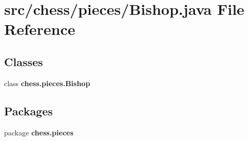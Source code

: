 \section{src/chess/pieces/\+Bishop.java File Reference}
\label{_bishop_8java}
\subsection*{Classes}
\begin{DoxyCompactItemize}
\item 
class {\bf chess.\+pieces.\+Bishop}
\end{DoxyCompactItemize}
\subsection*{Packages}
\begin{DoxyCompactItemize}
\item 
package {\bf chess.\+pieces}
\end{DoxyCompactItemize}

